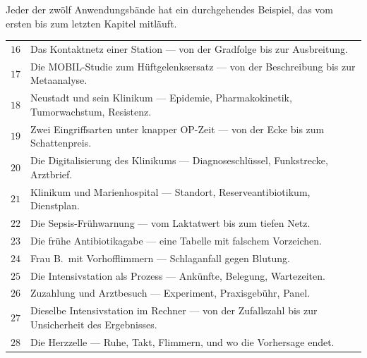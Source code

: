 \begin{merksatz}
Jeder der zwölf Anwendungsbände hat ein durchgehendes Beispiel, das vom ersten bis zum letzten Kapitel mitläuft.

\begin{center}
{\small
\renewcommand{\arraystretch}{1.5}
\begin{tabular}{@{}P{1.2cm}P{7.0cm}@{}}
\toprule
$16$ & Das Kontaktnetz einer Station --- von der Gradfolge bis zur Ausbreitung.\\
$17$ & Die MOBIL-Studie zum Hüftgelenksersatz --- von der Beschreibung bis zur Metaanalyse.\\
$18$ & Neustadt und sein Klinikum --- Epidemie, Pharmakokinetik, Tumorwachstum, Resistenz.\\
$19$ & Zwei Eingriffsarten unter knapper OP-Zeit --- von der Ecke bis zum Schattenpreis.\\
$20$ & Die Digitalisierung des Klinikums --- Diagnoseschlüssel, Funkstrecke, Arztbrief.\\
$21$ & Klinikum und Marienhospital --- Standort, Reserveantibiotikum, Dienstplan.\\
$22$ & Die Sepsis-Frühwarnung --- vom Laktatwert bis zum tiefen Netz.\\
$23$ & Die frühe Antibiotikagabe --- eine Tabelle mit falschem Vorzeichen.\\
$24$ & Frau B.\ mit Vorhofflimmern --- Schlaganfall gegen Blutung.\\
$25$ & Die Intensivstation als Prozess --- Ankünfte, Belegung, Wartezeiten.\\
$26$ & Zuzahlung und Arztbesuch --- Experiment, Praxisgebühr, Panel.\\
$27$ & Dieselbe Intensivstation im Rechner --- von der Zufallszahl bis zur Unsicherheit des Ergebnisses.\\
$28$ & Die Herzzelle --- Ruhe, Takt, Flimmern, und wo die Vorhersage endet.\\
\bottomrule
\end{tabular}}
\end{center}

\begin{center}
\begin{minipage}{0.88\textwidth}
\end{minipage}
\end{center}
\end{merksatz}

